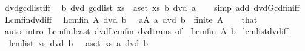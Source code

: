 \begin{isabellebody}
\endisatagproof
{\isafoldproof}%
%
\isadelimproof
\isanewline
%
\endisadelimproof
\isanewline
{}\isamarkupfalse%
\ dvd{\isacharunderscore}{\kern0pt}gcd{\isacharunderscore}{\kern0pt}list{\isacharunderscore}{\kern0pt}iff{\isacharcolon}{\kern0pt}\isanewline
\ \ {\isachardoublequoteopen}b\ dvd\ gcd{\isacharunderscore}{\kern0pt}list\ xs\ {\isasymlongleftrightarrow}\ {\isacharparenleft}{\kern0pt}{\isasymforall}a{\isasymin}set\ xs{\isachardot}{\kern0pt}\ b\ dvd\ a{\isacharparenright}{\kern0pt}{\isachardoublequoteclose}\isanewline
%
\isadelimproof
\ \ %
\endisadelimproof
%
\isatagproof
{}\isamarkupfalse%
\ {\isacharparenleft}{\kern0pt}simp\ add{\isacharcolon}{\kern0pt}\ dvd{\isacharunderscore}{\kern0pt}Gcd{\isacharunderscore}{\kern0pt}fin{\isacharunderscore}{\kern0pt}iff{\isacharparenright}{\kern0pt}%
\endisatagproof
{\isafoldproof}%
%
\isadelimproof
\isanewline
%
\endisadelimproof
\isanewline
{}\isamarkupfalse%
\ Lcm{\isacharunderscore}{\kern0pt}fin{\isacharunderscore}{\kern0pt}dvd{\isacharunderscore}{\kern0pt}iff{\isacharcolon}{\kern0pt}\isanewline
\ \ {\isachardoublequoteopen}Lcm\isactrlsub f\isactrlsub i\isactrlsub n\ A\ dvd\ b\ \ {\isasymlongleftrightarrow}\ {\isacharparenleft}{\kern0pt}{\isasymforall}a{\isasymin}A{\isachardot}{\kern0pt}\ a\ dvd\ b{\isacharparenright}{\kern0pt}{\isachardoublequoteclose}\ \ {\isachardoublequoteopen}finite\ A{\isachardoublequoteclose}\isanewline
%
\isadelimproof
\ \ %
\endisadelimproof
%
\isatagproof
{}\isamarkupfalse%
\ that\ \isamarkupfalse%
\ {\isacharparenleft}{\kern0pt}auto\ intro{\isacharcolon}{\kern0pt}\ Lcm{\isacharunderscore}{\kern0pt}fin{\isacharunderscore}{\kern0pt}least\ dvd{\isacharunderscore}{\kern0pt}Lcm{\isacharunderscore}{\kern0pt}fin\ dvd{\isacharunderscore}{\kern0pt}trans\ {\isacharbrackleft}{\kern0pt}of\ {\isacharunderscore}{\kern0pt}\ {\isachardoublequoteopen}Lcm\isactrlsub f\isactrlsub i\isactrlsub n\ A{\isachardoublequoteclose}\ b{\isacharbrackright}{\kern0pt}{\isacharparenright}{\kern0pt}%
\endisatagproof
{\isafoldproof}%
%
\isadelimproof
\isanewline
%
\endisadelimproof
\isanewline
{}\isamarkupfalse%
\ lcm{\isacharunderscore}{\kern0pt}list{\isacharunderscore}{\kern0pt}dvd{\isacharunderscore}{\kern0pt}iff{\isacharcolon}{\kern0pt}\isanewline
\ \ {\isachardoublequoteopen}lcm{\isacharunderscore}{\kern0pt}list\ xs\ dvd\ b\ \ {\isasymlongleftrightarrow}\ {\isacharparenleft}{\kern0pt}{\isasymforall}a{\isasymin}set\ xs{\isachardot}{\kern0pt}\ a\ dvd\ b{\isacharparenright}{\kern0pt}{\isachardoublequoteclose}\isanewline

\end{isabellebody}
